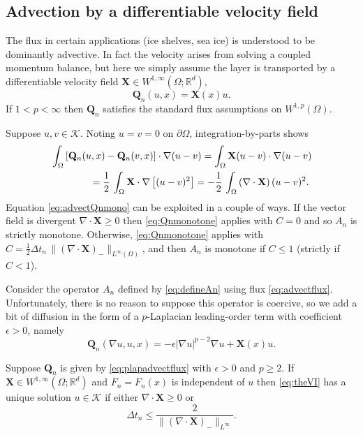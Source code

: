\documentclass[final,onefignum]{siamart190516}
\newcommand\bQ{\mathbf{Q}}
\newcommand\bX{\mathbf{X}}
\newcommand{\Div}{\nabla\cdot}
\newcommand\eps{\epsilon}
\newcommand{\grad}{\nabla}
\newcommand\RR{\mathbb{R}}
\begin{document}
\subsection{Advection by a differentiable velocity field} \label{subsec:advect}  The flux in certain applications (ice shelves, sea ice) is understood to be dominantly advective.  In fact the velocity arises from solving a coupled momentum balance, but here we simply assume the layer is transported by a differentiable velocity field $\bX \in W^{1,\infty}(\Omega;\RR^d)$,
\begin{equation}
  \bQ_n(u,x) = \bX(x) u. \label{eq:advectflux}
\end{equation}
If $1<p<\infty$ then $\bQ_n$ satisfies the standard flux assumptions on $W^{1,p}(\Omega)$.

Suppose $u,v\in\mathcal{K}$.  Noting $u=v=0$ on $\partial \Omega$, integration-by-parts shows
\begin{align}
   &\int_\Omega \left[\bQ_n(u,x) - \bQ_n(v,x)\right] \cdot \grad (u - v) = \int_\Omega \bX (u-v) \cdot \grad (u - v)   \label{eq:advectQnmono} \\
   &\qquad\qquad = \frac{1}{2}\,\int_\Omega \bX \cdot \grad\left[ (u - v)^2 \right] = - \frac{1}{2}\,\int_\Omega \left(\Div\bX\right) (u - v)^2. \notag
\end{align}
Equation \eqref{eq:advectQnmono} can be exploited in a couple of ways.  If the vector field is divergent $\Div\bX\ge 0$ then \eqref{eq:Qnmonotone} applies with $C=0$ and so $A_n$ is strictly monotone.  Otherwise, \eqref{eq:Qnmonotone} applies with $C = \frac{1}{2}\Delta t_n\,\|(\Div\bX)_{-}\|_{L^\infty(\Omega)}$, and then $A_n$ is monotone if $C \le 1$ (strictly if $C < 1$).

Consider the operator $A_n$ defined by \eqref{eq:defineAn} using flux \eqref{eq:advectflux}.  Unfortunately, there is no reason to suppose this operator is coercive, so we add a bit of diffusion in the form of a $p$-Laplacian leading-order term with coefficient $\eps>0$, namely
\begin{equation}
  \bQ_n(\grad u,u,x) = -\eps |\grad u|^{p-2} \grad u + \bX(x) u.   \label{eq:plapadvectflux}
\end{equation}

\begin{theorem}  \label{thm:plapadvectwellposed}  Suppose $\bQ_n$ is given by \eqref{eq:plapadvectflux} with $\eps>0$ and $p\ge 2$.  If $\bX \in W^{1,\infty}(\Omega;\RR^d)$ and $F_n=F_n(x)$ is independent of $u$ then \eqref{eq:theVI} has a unique solution $u\in\mathcal{K}$ if either $\Div \bX \ge 0$ or
\begin{equation}
  \Delta t_n \le \frac{2}{\|(\Div \bX)_-\|_{L^\infty}}. \label{eq:plapadvectdtcond}
\end{equation}
\end{theorem}
\end{document}
